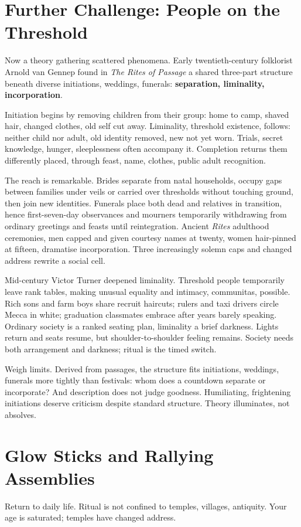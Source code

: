 \section[Further Challenge: At the Threshold]{Further Challenge: People on the Threshold}
Now a theory gathering scattered phenomena. Early twentieth-century folklorist Arnold van Gennep found in \textit{The Rites of Passage} a shared three-part structure beneath diverse initiations, weddings, funerals: \textbf{separation, liminality, incorporation}.

Initiation begins by removing children from their group: home to camp, shaved hair, changed clothes, old self cut away. Liminality, threshold existence, follows: neither child nor adult, old identity removed, new not yet worn. Trials, secret knowledge, hunger, sleeplessness often accompany it. Completion returns them differently placed, through feast, name, clothes, public adult recognition.

The reach is remarkable. Brides separate from natal households, occupy gaps between families under veils or carried over thresholds without touching ground, then join new identities. Funerals place both dead and relatives in transition, hence first-seven-day observances and mourners temporarily withdrawing from ordinary greetings and feasts until reintegration. Ancient \textit{Rites} adulthood ceremonies, men capped and given courtesy names at twenty, women hair-pinned at fifteen, dramatise incorporation. Three increasingly solemn caps and changed address rewrite a social cell.

Mid-century Victor Turner deepened liminality. Threshold people temporarily leave rank tables, making unusual equality and intimacy, communitas, possible. Rich sons and farm boys share recruit haircuts; rulers and taxi drivers circle Mecca in white; graduation classmates embrace after years barely speaking. Ordinary society is a ranked seating plan, liminality a brief darkness. Lights return and seats resume, but shoulder-to-shoulder feeling remains. Society needs both arrangement and darkness; ritual is the timed switch.

Weigh limits. Derived from passages, the structure fits initiations, weddings, funerals more tightly than festivals: whom does a countdown separate or incorporate? And description does not judge goodness. Humiliating, frightening initiations deserve criticism despite standard structure. Theory illuminates, not absolves.

\section{Glow Sticks and Rallying Assemblies}
Return to daily life. Ritual is not confined to temples, villages, antiquity. Your age is saturated; temples have changed address.

